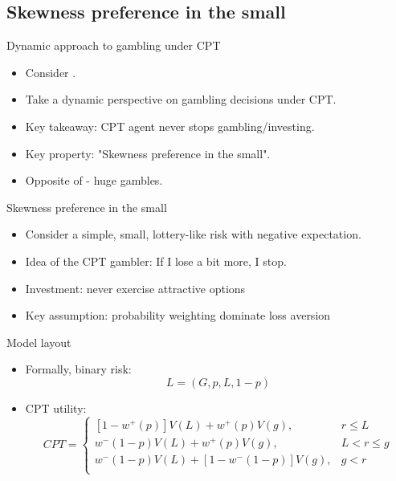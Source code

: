 \subsection{Skewness preference in the small}


\begin{frame}{Dynamic approach to gambling under CPT}
    \begin{itemize}
        \item Consider \citet{EbertStrack2015}.\medskip
        \item Take a dynamic perspective on gambling decisions under CPT.\medskip
        \item Key takeaway: CPT agent never stops gambling/investing.\medskip
        \item Key property: "Skewness preference in the small".\medskip
        \item Opposite of \citet{AzevedoGottlieb2012} - huge gambles.\medskip
	\end{itemize}
\end{frame}

\begin{frame}{Skewness preference in the small}
    \begin{itemize}
        \item Consider a simple, small, lottery-like risk with negative expectation.\medskip
        \item Idea of the CPT gambler: If I lose a bit more, I stop.\medskip
        \item Investment: never exercise attractive  options\medskip
        \item Key assumption: probability weighting dominate loss aversion\medskip
	\end{itemize}
\end{frame}

\begin{frame}{Model layout}
    \begin{itemize}
        \item Formally, binary risk: \[L = (G, p, L, 1 - p)\]\medskip
        \item CPT utility:
    \begin{equation}
        CPT = \begin{cases}
        [1-w^+(p)]V(L)+w^+(p)V(g),  & r \leq  L\\
        w^-(1-p)V(L)+w^+(p)V(g) ,  & L< r \leq g \\
        w^-(1-p)V(L)+[1-w^-(1-p)]V(g),  & g< r\\
        \end{cases}
    \end{equation}
\end{itemize}
\end{frame}

